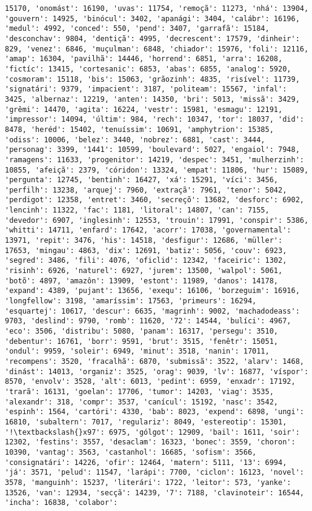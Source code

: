 \documentclass[11pt]{article}
\begin{document}
\begin{Verbatim}[commandchars=\\\{\}]
15170, 'onomást': 16190, 'uvas': 11754, 'remoçã': 11273, 'nhá': 13904, 'gouvern': 14925, 'binócul': 3402, 'apanági': 3404, 'calábr': 16196, 'medul': 4992, 'conced': 550, 'pend': 3407, 'garrafã': 15184, 'desconchav': 9804, 'dentiçã': 4995, 'decrescent': 17579, 'dinheir': 829, 'venez': 6846, 'muçulman': 6848, 'chiador': 15976, 'foli': 12116, 'amap': 16304, 'pavilhã': 14446, 'horrend': 6851, 'arra': 16208, 'fictíc': 13415, 'cortesanic': 6853, 'abas': 6855, 'analog': 5920, 'cosmoram': 15118, 'bis': 15063, 'grãozinh': 4835, 'risível': 11739, 'signatári': 9379, 'impacient': 3187, 'politeam': 15567, 'infal': 3425, 'albernaz': 12219, 'anten': 14350, 'bri': 5013, 'missã': 3429, 'grêmi': 14470, 'agita': 16224, 'vestr': 15981, 'esmagu': 12191, 'impressor': 14094, 'últim': 984, 'rech': 10347, 'tor': 18037, 'did': 8478, 'heréd': 15402, 'tenuíssim': 10691, 'amphytrion': 15385, 'odiss': 10006, 'belez': 3440, 'nobrez': 6881, 'cast': 3444, 'personag': 3399, '1441': 10599, 'boulevard': 5027, 'engaiol': 7948, 'ramagens': 11633, 'progenitor': 14219, 'despec': 3451, 'mulherzinh': 10855, 'afeiçã': 2379, 'córidon': 13324, 'empat': 11806, 'hur': 15089, 'pergunta': 12745, 'bentinh': 16427, 'xá': 15291, 'víci': 3456, 'perfilh': 13238, 'arquej': 7960, 'extraçã': 7961, 'tenor': 5042, 'perdigot': 12358, 'entret': 3460, 'secreçõ': 13682, 'desforc': 6902, 'lencinh': 11322, 'fac': 1181, 'litoral': 14807, 'can': 7155, 'devedor': 6907, 'inglesinh': 12553, 'trouin': 17991, 'conspir': 5386, 'whitti': 14711, 'enfard': 17642, 'acorr': 17038, 'governamental': 13971, 'repit': 3476, 'his': 14518, 'desfigur': 12686, 'müller': 17653, 'mingau': 4863, 'dix': 12691, 'batiz': 5056, 'couv': 6923, 'segred': 3486, 'fili': 4076, 'oficlid': 12342, 'faceiric': 1302, 'risinh': 6926, 'naturel': 6927, 'jurem': 13500, 'walpol': 5061, 'botõ': 4897, 'amazôn': 13909, 'estont': 11989, 'danos': 14178, 'expand': 4389, 'pujant': 13656, 'exequ': 16106, 'borzeguim': 16916, 'longfellow': 3198, 'amaríssim': 17563, 'primeurs': 16294, 'esquartej': 10617, 'descur': 6635, 'magrinh': 9002, 'machadodeass': 9703, 'deslind': 9790, 'romb': 11620, '72': 14544, 'bulíci': 4967, 'eco': 3506, 'distribu': 5080, 'panam': 16317, 'persegu': 3510, 'debentur': 16761, 'borr': 9591, 'brut': 3515, 'fenêtr': 15051, 'ondul': 9959, 'soleir': 6949, 'minut': 3518, 'nanin': 17011, 'recompens': 3520, 'fracalhã': 6870, 'submissã': 3522, 'alarv': 1468, 'dinást': 14013, 'organiz': 3525, 'orag': 9039, 'lv': 16877, 'víspor': 8570, 'envolv': 3528, 'alt': 6013, 'pedint': 6959, 'enxadr': 17192, 'trarã': 16131, 'goelan': 17706, 'tumor': 14203, 'viag': 3535, 'alexandr': 318, 'compr': 3537, 'canícul': 15192, 'nasc': 3542, 'espinh': 1564, 'cartóri': 4330, 'bab': 8023, 'expend': 6898, 'ungi': 16810, 'subaltern': 7017, 'regulariz': 8049, 'estereotip': 15301, '!\textbackslash{}x97': 6975, 'gólgot': 12909, 'bail': 1611, 'soir': 12302, 'festins': 3557, 'desaclam': 16323, 'bonec': 3559, 'choron': 10390, 'vantag': 3563, 'castanhol': 16685, 'sofism': 3566, 'consignatári': 14226, 'ofir': 12464, 'matern': 5111, '13': 6994, 'já': 3571, 'pelud': 11547, 'larápi': 7700, 'ciclon': 16123, 'novel': 3578, 'manguinh': 15237, 'literári': 1722, 'leitor': 573, 'yanke': 13526, 'van': 12934, 'secçã': 14239, '7': 7188, 'clavinoteir': 16544, 'incha': 16838, 'colabor': 
\end{Verbatim}
\end{document}
